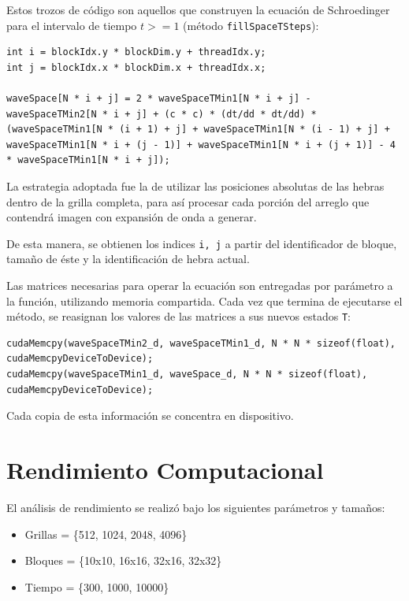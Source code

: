 \documentclass[jou]{apa6}
\begin{document}
Estos trozos de código son aquellos que construyen la ecuación de Schroedinger para el intervalo de tiempo $t >= 1$ (método \texttt{fillSpaceTSteps}):

\lstset{language=C, breaklines=true, frame=single}

\begin{lstlisting}
int i = blockIdx.y * blockDim.y + threadIdx.y;
int j = blockIdx.x * blockDim.x + threadIdx.x;

waveSpace[N * i + j] = 2 * waveSpaceTMin1[N * i + j] - waveSpaceTMin2[N * i + j] + (c * c) * (dt/dd * dt/dd) * (waveSpaceTMin1[N * (i + 1) + j] + waveSpaceTMin1[N * (i - 1) + j] + waveSpaceTMin1[N * i + (j - 1)] + waveSpaceTMin1[N * i + (j + 1)] - 4 * waveSpaceTMin1[N * i + j]);
\end{lstlisting}

La estrategia adoptada fue la de utilizar las posiciones absolutas de las hebras dentro de la grilla completa, para así procesar cada porción del arreglo que contendrá imagen con expansión de onda a generar.

De esta manera, se obtienen los indices \texttt{i, j} a partir del identificador de bloque, tamaño de éste y la identificación de hebra actual.

Las matrices necesarias para operar la ecuación son entregadas por parámetro a la función, utilizando memoria compartida. Cada vez que termina de ejecutarse el método, se reasignan los valores de las matrices a sus nuevos estados \texttt{T}:

\lstset{language=C, breaklines=true, frame=single}

\begin{lstlisting}
cudaMemcpy(waveSpaceTMin2_d, waveSpaceTMin1_d, N * N * sizeof(float), cudaMemcpyDeviceToDevice);
cudaMemcpy(waveSpaceTMin1_d, waveSpace_d, N * N * sizeof(float), cudaMemcpyDeviceToDevice);
\end{lstlisting}

Cada copia de esta información se concentra en dispositivo.

\section{Rendimiento Computacional}

El análisis de rendimiento se realizó bajo los siguientes parámetros y tamaños:

\begin{itemize}
	\item Grillas = \{512, 1024, 2048, 4096\}
	\item Bloques = \{10x10, 16x16, 32x16, 32x32\}
	\item Tiempo = \{300, 1000, 10000\}
\end{itemize}
\end{document}
